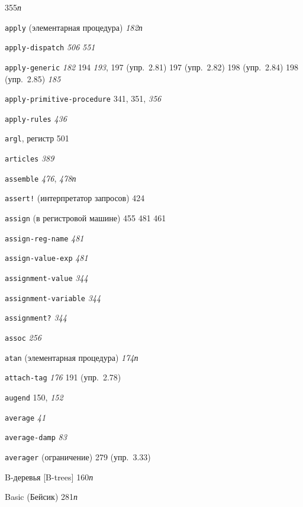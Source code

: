 \begin{theindex}
   355{\it п}
\item {\texttt{apply} (элементарная процедура)} {\it 182}{\it п}
\item {\texttt{apply-dispatch}} {\it 506}
   {\it 551}
\item {\texttt{apply-generic}} {\it 182}
   194
   {\it 193}, 197 (упр.~2.81)
   197 (упр.~2.82)
   198 (упр.~2.84)
   198 (упр.~2.85)
   {\it 185}
\item {\texttt{apply-primitive-procedure}} 341, 351, {\it 356}
\item {\texttt{apply-rules}} {\it 436}
\item {\texttt{argl}, регистр} 501
\item {\texttt{articles}} {\it 389}
\item {\texttt{assemble}} {\it 476}, {\it 478}{\it п}
\item {\texttt{assert!} (интерпретатор запросов)} 424
\item {\texttt{assign} (в регистровой машине)} 455
   481
   461
\item {\texttt{assign-reg-name}} {\it 481}
\item {\texttt{assign-value-exp}} {\it 481}
\item {\texttt{assignment-value}} {\it 344}
\item {\texttt{assignment-variable}} {\it 344}
\item {\texttt{assignment?}} {\it 344}
\item {\texttt{assoc}} {\it 256}
\item {\texttt{atan} (элементарная процедура)} {\it 174}{\it п}
\item {\texttt{attach-tag}} {\it 176}
   191 (упр.~2.78)
\item {\texttt{augend}} 150, {\it 152}
\item {\texttt{average}} {\it 41}
\item {\texttt{average-damp}} {\it 83}
\item {\texttt{averager} (ограничение)} 279 (упр.~3.33)
\bigskip
\item {B-деревья [B-trees]} 160{\it п}
\item {Basic (Бейсик)}
   281{\it п}

\end{theindex}
